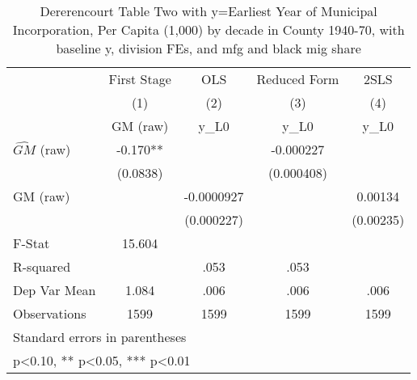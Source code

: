 \begin{table}[htbp]\centering
\def\sym#1{\ifmmode^{#1}\else\(^{#1}\)\fi}
\caption{Dererencourt Table Two with y=Earliest Year of Municipal Incorporation, Per Capita (1,000) by decade in County 1940-70, with baseline y, division FEs, and mfg and black mig share}
\begin{tabular}{l*{4}{c}}
\toprule
                    & First Stage   &         OLS   &Reduced Form   &        2SLS   \\
                    &\multicolumn{1}{c}{(1)}&\multicolumn{1}{c}{(2)}&\multicolumn{1}{c}{(3)}&\multicolumn{1}{c}{(4)}\\
                    &\multicolumn{1}{c}{GM  (raw)}&\multicolumn{1}{c}{y\_L0}&\multicolumn{1}{c}{y\_L0}&\multicolumn{1}{c}{y\_L0}\\
\midrule
$\hat{GM}$ (raw)    &      -0.170** &               &   -0.000227   &               \\
                    &    (0.0838)   &               &  (0.000408)   &               \\
\addlinespace
GM  (raw)           &               &  -0.0000927   &               &     0.00134   \\
                    &               &  (0.000227)   &               &   (0.00235)   \\
\midrule
F-Stat              &      15.604   &               &               &               \\
R-squared           &               &        .053   &        .053   &               \\
Dep Var Mean        &       1.084   &        .006   &        .006   &        .006   \\
Observations        &        1599   &        1599   &        1599   &        1599   \\
\bottomrule
\multicolumn{5}{l}{\footnotesize Standard errors in parentheses}\\
\multicolumn{5}{l}{\footnotesize * p<0.10, ** p<0.05, *** p<0.01}\\
\end{tabular}
\end{table}
